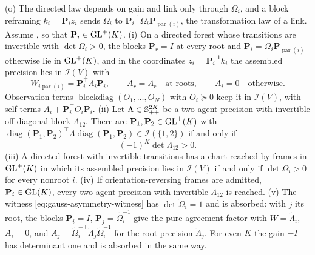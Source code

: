 (o) The directed law depends on gain and link only through \(\Omega_i\), and a
block reframing \(k_i=\mathbf P_iz_i\) sends \(\Omega_i\) to
\(\mathbf P_i^{-1}\Omega_i\mathbf P_{\operatorname{par}(i)}\), the transformation law of a link.
Assume , so that \(\mathbf P_i\in\mathrm{GL}^+(K)\).
(i) On a directed forest whose transitions are invertible with
\(\det\Omega_i>0\), the blocks \(\mathbf P_r=I\) at every root and
\(\mathbf P_i=\Omega_i\mathbf P_{\operatorname{par}(i)}\) otherwise lie in \(\mathrm{GL}^+(K)\), and in
the coordinates \(z_i=\mathbf P_i^{-1}k_i\) the assembled precision lies in
\(\mathcal I(V)\) with
\begin{equation}
W_{i\operatorname{par}(i)}=\mathbf P_i^\top\Lambda_i\mathbf P_i,
\qquad
A_r=\Lambda_r\quad\text{at roots},
\qquad
A_i=0\quad\text{otherwise}.
\label{eq:gauss-gain-absorbed}
\end{equation}
Observation terms \(\operatorname{blockdiag}(O_1,\dots,O_N)\) with
\(O_i\succeq0\) keep it in \(\mathcal I(V)\), with self terms
\(A_i+\mathbf P_i^\top O_i\mathbf P_i\).
(ii) Let \(\Lambda\in\mathbb S_{++}^{2K}\) be a two-agent precision with invertible
off-diagonal block \(\Lambda_{12}\). There are \(\mathbf P_1,\mathbf P_2\in\mathrm{GL}^+(K)\) with
\(\operatorname{diag}(\mathbf P_1,\mathbf P_2)^\top\Lambda\operatorname{diag}(\mathbf P_1,\mathbf P_2)\in\mathcal I(\{1,2\})\)
if and only if
\begin{equation}
(-1)^K\det\Lambda_{12}>0.
\label{eq:gauss-orientation-criterion}
\end{equation}
(iii) A directed forest with invertible transitions has a chart reached by
frames in \(\mathrm{GL}^+(K)\) in which its assembled precision lies in
\(\mathcal I(V)\) if and only if \(\det\Omega_i>0\) for every nonroot \(i\).
(iv) If orientation-reversing frames are admitted, \(\mathbf P_i\in\mathrm{GL}(K)\), every
two-agent precision with invertible \(\Lambda_{12}\) is reached.
(v) The witness \eqref{eq:gauss-asymmetry-witness} has \(\det\widetilde\Omega_i=1\)
and is absorbed: with \(j\) its root, the blocks \(\mathbf P_i=I\),
\(\mathbf P_j=\widetilde\Omega_i^{-1}\) give the pure agreement factor with
\(W=\widetilde\Lambda_i\), \(A_i=0\), and
\(A_j=\widetilde\Omega_i^{-\top}\widetilde\Lambda_j\widetilde\Omega_i^{-1}\) for
the root precision \(\widetilde\Lambda_j\). For even \(K\) the gain \(-I\) has
determinant one and is absorbed in the same way. 

